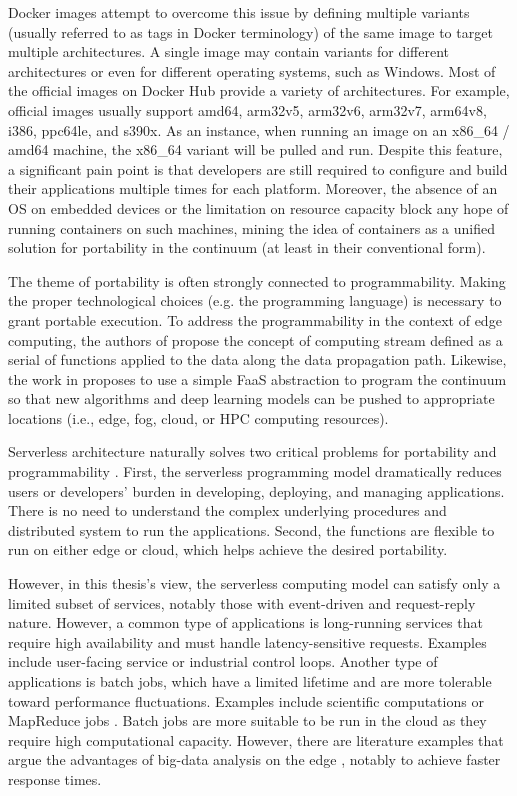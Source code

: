 Docker images attempt to overcome this issue by defining multiple variants (usually referred to as tags in Docker terminology) of the same image to target multiple architectures. A single image may contain variants for different architectures or even for different operating systems, such as Windows. Most of the official images on Docker Hub \cite{docker-hub} provide a variety of architectures. For example, official images usually support amd64, arm32v5, arm32v6, arm32v7, arm64v8, i386, ppc64le, and s390x. As an instance, when running an image on an x86\_64 / amd64 machine, the x86\_64 variant will be pulled and run. Despite this feature, a significant pain point is that developers are still required to configure and build their applications multiple times for each platform. Moreover, the absence of an OS on embedded devices or the limitation on resource capacity block any hope of running containers on such machines, mining the idea of containers as a unified solution for portability in the continuum (at least in their conventional form).

The theme of portability is often strongly connected to programmability. Making the proper technological choices (e.g. the programming language) is necessary to grant portable execution. To address the programmability in the context of edge computing, the authors of \cite{edge-computing-vision-challenges} propose the concept of computing stream defined as a serial of functions applied to the data along the data propagation path. Likewise, the work in \cite{harnessing-continuum} proposes to use a simple FaaS abstraction to program the continuum so that new algorithms and deep learning models can be pushed to appropriate locations (i.e., edge, fog, cloud, or HPC computing resources).

Serverless architecture naturally solves two critical problems for portability and programmability \cite{lavea}. First, the serverless programming model dramatically reduces users or developers' burden in developing, deploying, and managing applications. There is no need to understand the complex underlying procedures and distributed system to run the applications. Second, the functions are flexible to run on either edge or cloud, which helps achieve the desired portability.

However, in this thesis's view, the serverless computing model can satisfy only a limited subset of services, notably those with event-driven and request-reply nature. However, a common type of applications is long-running services that require high availability and must handle latency-sensitive requests. Examples include user-facing service or industrial control loops. Another type of applications is batch jobs, which have a limited lifetime and are more tolerable toward performance fluctuations. Examples include scientific computations or MapReduce jobs \cite{map-reduce}. Batch jobs are more suitable to be run in the cloud as they require high computational capacity. However, there are literature examples that argue the advantages of big-data analysis on the edge \cite{data-analytics-iot}, notably to achieve faster response times.

